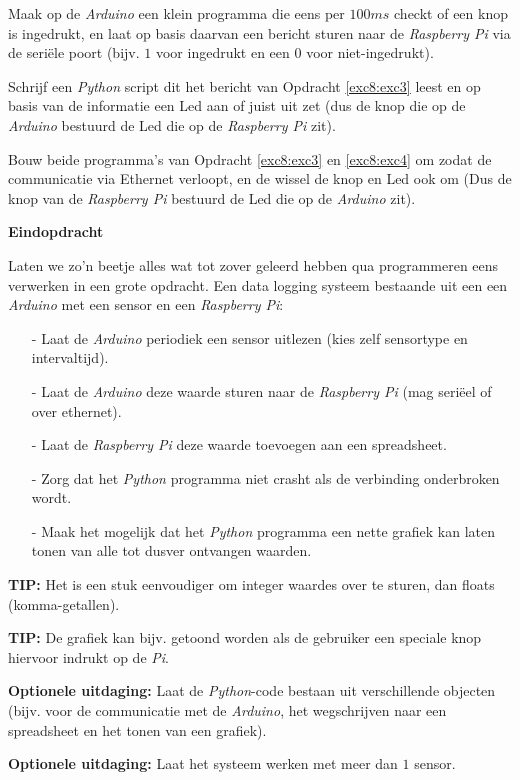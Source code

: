 \begin{exercise}
  \label{exc8:exc3}
  Maak op de \textit{Arduino} een klein programma die eens per $100ms$ checkt of een knop is ingedrukt, en laat op basis daarvan een bericht sturen naar de \textit{Raspberry Pi} via de seriële poort (bijv. $1$ voor ingedrukt en een $0$ voor niet-ingedrukt). 
\end{exercise}

\begin{exercise}
  \label{exc8:exc4}
  Schrijf een \textit{Python} script dit het bericht van Opdracht \ref{exc8:exc3} leest en op basis van de informatie een Led aan of juist uit zet (dus de knop die op de \textit{Arduino} bestuurd de Led die op de \textit{Raspberry Pi} zit).
\end{exercise}

\begin{exercise}
  Bouw beide programma's van Opdracht \ref{exc8:exc3} en \ref{exc8:exc4} om zodat de communicatie via Ethernet verloopt, en de wissel de knop en Led ook om (Dus de knop van de \textit{Raspberry Pi} bestuurd de Led die op de \textit{Arduino} zit).
\end{exercise}

\begin{exercise}
  \textbf{Eindopdracht} 
  
  Laten we zo'n beetje alles wat tot zover geleerd hebben qua programmeren eens verwerken in een grote opdracht. Een data logging systeem bestaande uit een een \textit{Arduino} met een sensor en een \textit{Raspberry Pi}: 

  \begin{itemize}
    \item[-] Laat de \textit{Arduino} periodiek een sensor uitlezen (kies zelf sensortype en intervaltijd).
    \item[-] Laat de \textit{Arduino} deze waarde sturen naar de \textit{Raspberry Pi} (mag seriëel of over ethernet).
    \item[-] Laat de \textit{Raspberry Pi} deze waarde toevoegen aan een spreadsheet.
    \item[-] Zorg dat het \textit{Python} programma niet crasht als de verbinding onderbroken wordt.
    \item[-] Maak het mogelijk dat het \textit{Python} programma een nette grafiek kan laten tonen van alle tot dusver ontvangen waarden.
  \end{itemize}

  \textbf{TIP:} Het is een stuk eenvoudiger om integer waardes over te sturen, dan floats (komma-getallen). 
  
  \textbf{TIP:} De grafiek kan bijv. getoond worden als de gebruiker een speciale knop hiervoor indrukt op de \textit{Pi}.  
  
  \textbf{Optionele uitdaging:} Laat de \textit{Python}-code bestaan uit verschillende objecten (bijv. voor de communicatie met de \textit{Arduino}, het wegschrijven naar een spreadsheet en het tonen van een grafiek). 
  
  \textbf{Optionele uitdaging:} Laat het systeem werken met meer dan $1$ sensor.
\end{exercise}

